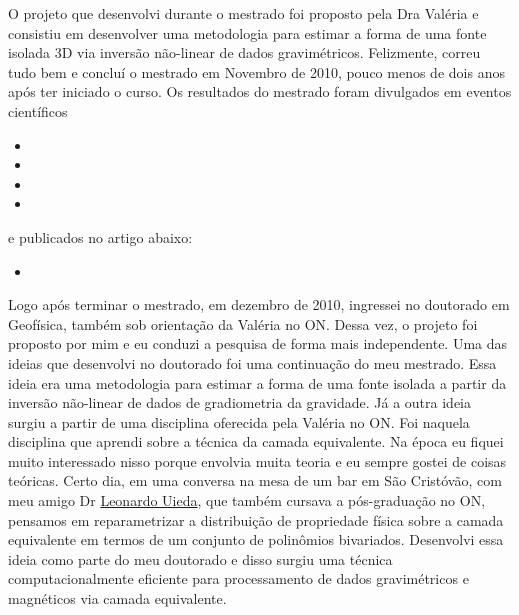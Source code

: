 O projeto que desenvolvi durante o mestrado foi proposto pela Dra Valéria e consistiu
em desenvolver uma metodologia para estimar a forma de uma fonte isolada 3D via inversão
não-linear de dados gravimétricos. Felizmente, correu tudo bem e concluí o mestrado 
em Novembro de 2010, pouco menos de dois anos após ter iniciado o curso.
Os resultados do mestrado foram divulgados em eventos científicos
\begin{itemize}
	\item {}
	\item {}
	\item {}
	\item {}
\end{itemize}
\noindent e publicados no artigo abaixo:
\begin{itemize}
	\item {} 
\end{itemize}

Logo após terminar o mestrado, em dezembro de 2010, ingressei no doutorado em Geofísica,
também sob orientação da Valéria no ON. Dessa vez, o projeto foi proposto por mim
e eu conduzi a pesquisa de forma mais independente. Uma das ideias que desenvolvi no 
doutorado foi uma continuação do meu mestrado. Essa ideia era uma metodologia para
estimar a forma de uma fonte isolada a partir da inversão não-linear de dados de 
gradiometria da gravidade. Já a outra ideia surgiu a partir de uma disciplina oferecida
pela Valéria no ON. Foi naquela disciplina que aprendi sobre a técnica da camada 
equivalente. Na época eu fiquei muito interessado nisso porque envolvia muita teoria e eu
sempre gostei de coisas teóricas.
Certo dia, em uma conversa na mesa de um bar em São Cristóvão, com meu amigo Dr
\href{https://www.leouieda.com/}{Leonardo Uieda}, que também cursava a pós-graduação no ON, pensamos em reparametrizar a
distribuição de propriedade física sobre a camada equivalente em termos de um conjunto de
polinômios bivariados. Desenvolvi essa ideia como parte do meu doutorado e disso 
surgiu uma técnica computacionalmente eficiente para processamento de dados gravimétricos
e magnéticos via camada equivalente.

